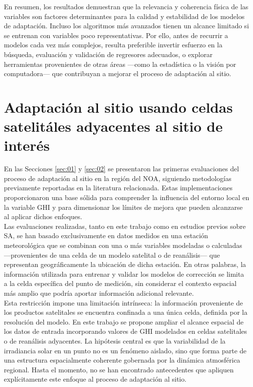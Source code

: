 En resumen, los resultados demuestran que la relevancia y coherencia física de las variables son factores determinantes para la calidad y estabilidad de los modelos de adaptación. Incluso los algoritmos más avanzados tienen un alcance limitado si se entrenan con variables poco representativas. Por ello, antes de recurrir a modelos cada vez más complejos, resulta preferible invertir esfuerzo en la búsqueda, evaluación y validación de regresores adecuados, o explorar herramientas provenientes de otras áreas —como la estadística o la visión por computadora— que contribuyan a mejorar el proceso de adaptación al sitio.





\section{Adaptación al sitio usando celdas satelitáles adyacentes al sitio de interés}\label{sec:03}

En las Secciones \ref{sec:01} y \ref{sec:02} se presentaron las primeras evaluaciones del proceso de adaptación al sitio en la región del NOA, siguiendo metodologías previamente reportadas en la literatura relacionada. Estas implementaciones proporcionaron una base sólida para comprender la influencia del entorno local en la variable GHI y para dimensionar los límites de mejora que pueden alcanzarse al aplicar dichos enfoques.\\

Las evaluaciones realizadas, tanto en este trabajo como en estudios previos sobre SA, se han basado exclusivamente en datos medidos en una estación meteorológica que se combinan con una o más variables modeladas o calculadas —provenientes de una celda de un modelo satelital o de reanálisis— que representan geográficamente la ubicación de dicha estación. En otras palabras, la información utilizada para entrenar y validar los modelos de corrección se limita a la celda específica del punto de medición, sin considerar el contexto espacial más amplio que podría aportar información adicional relevante.\\

Esta restricción impone una limitación intrínseca: la información proveniente de los productos satelitales se encuentra confinada a una única celda, definida por la resolución del modelo. En este trabajo se propone ampliar el alcance espacial de los datos de entrada incorporando valores de GHI modelados en celdas satelitales o de reanálisis adyacentes. La hipótesis central es que la variabilidad de la irradiancia solar en un punto no es un fenómeno aislado, sino que forma parte de una estructura espacialmente coherente gobernada por la dinámica atmosférica regional. Hasta el momento, no se han encontrado antecedentes que apliquen explícitamente este enfoque al proceso de adaptación al sitio.\\

